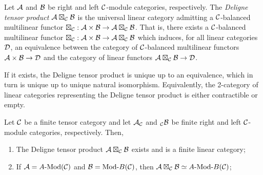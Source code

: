 \documentclass{amsart}
\begin{document}
\begin{definition}
	Let $\mathcal A$ and $\mathcal B$ be right and left $\mathcal C$-module categories, respectively. The {\em Deligne tensor product $\mathcal A \boxtimes_{\mathcal C} \mathcal B$} is the universal linear category admitting a $\mathcal C$-balanced multilinear functor $\boxtimes_{\mathcal C}: \mathcal A \times \mathcal B \to \mathcal A \boxtimes_{\mathcal C} \mathcal B$. That is, there exists a $\mathcal C$-balanced multilinear functor $\boxtimes_{\mathcal C}: \mathcal A \times \mathcal B \to \mathcal A \boxtimes_{\mathcal C} \mathcal B$ which induces, for all linear categories $\mathcal D$, an equivalence between the category of $\mathcal C$-balanced multilinear functors $\mathcal A \times \mathcal B \to \mathcal D$ and the category of linear functors $\mathcal A \boxtimes_{\mathcal C} \mathcal B \to \mathcal D$. 
\end{definition}

If it exists, the Deligne tensor product is unique up to an equivalence, which in turn is unique up to unique natural isomorphism. Equivalently, the 2-category of linear categories representing the Deligne tensor product is either contractible or empty. 

\begin{theorem} \label{thm:DelignePrdtOverATCExists}
	Let $\mathcal C$ be a finite tensor category and let $\mathcal A_{\mathcal C}$ and ${}_{\mathcal C}\mathcal B$ be finite right and left $\mathcal C$-module categories, respectively. Then, 
	\begin{enumerate}
		\item The Deligne tensor product $\mathcal A \boxtimes_{\mathcal C} \mathcal B$ exists and is a finite linear category;
		\item If $\cA = \Mod{A}{}(\cC)$ and $\cB = \Mod{}{B}(\cC)$, then $\cA \boxtimes_{\cC} \cB \simeq \Mod{A }{B}(\cC)$;
	\end{enumerate} 
\end{theorem}
\end{document}
